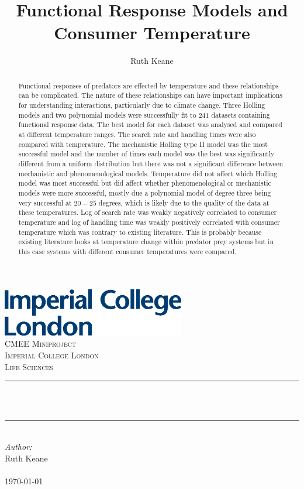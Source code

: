 \documentclass{article}
\newcommand{\HRule}{\rule{\linewidth}{1mm}}
\begin{document}
\title{Functional Response Models and Consumer Temperature}%
\author{Ruth Keane}

\begin{titlepage}
\includegraphics[width=8cm]{logo.eps}\\[1cm] 
\center 
\textsc{\LARGE CMEE Miniproject}\\[1.5cm] 
\textsc{\Large Imperial College London}\\[0.5cm]
\textsc{\large Life Sciences}\\[0.5cm] 
\makeatletter
\HRule \\[0.4cm]
{ \huge \bfseries \@title}\\[0.4cm] %
\HRule \\[1.5cm]
\makeatother
\Large \emph{Author:}\\
Ruth Keane \\[3cm] %
\\
{\large \today}\\[2cm] %
\vfill %
\clearpage
\end{titlepage}
\tableofcontents
\newpage
\linenumbers
\begin{abstract}
Functional responses of predators are effected by temperature and these relationships can be complicated. The nature of these relationships can have important implications for understanding interactions, particularly due to climate change. Three Holling models and two polynomial models were successfully fit to $241$ datasets containing functional response data. The best model for each dataset was analysed and compared at different temperature ranges. The search rate and handling times were also compared with temperature. The mechanistic Holling type II model was the most successful model  and the number of times each model was the best was significantly different from a uniform distribution but there was not a significant difference between mechanistic and phenomenological models. Temperature did not affect which Holling model was most successful but did affect whether phenomenological or mechanistic models were more successful, mostly due a polynomial model of degree three being very successful at $20-25$ degrees, which is likely due to the quality of the data at these temperatures. Log of search rate was weakly negatively correlated  to consumer temperature and log of handling time was weakly positively correlated with consumer temperature which was contrary to existing literature. This is probably because existing literature looks at temperature change within predator prey systems but in this case systems with different consumer temperatures were compared. 
\end{abstract}
\end{document}
